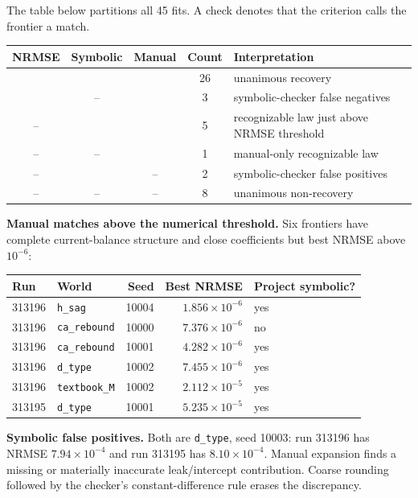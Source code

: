 \documentclass[10pt]{article}
\newcommand{\yes}{\checkmark}
\newcommand{\no}{--}
\begin{document}
The table below partitions all 45 fits.  A check denotes that the criterion calls
the frontier a match.

\begin{center}
\begin{tabular}{ccccl}
\toprule
NRMSE & Symbolic & Manual & Count & Interpretation\\
\midrule
\yes & \yes & \yes & 26 & unanimous recovery\\
\yes & \no  & \yes & 3 & symbolic-checker false negatives\\
\no  & \yes & \yes & 5 & recognizable law just above NRMSE threshold\\
\no  & \no  & \yes & 1 & manual-only recognizable law\\
\no  & \yes & \no  & 2 & symbolic-checker false positives\\
\no  & \no  & \no  & 8 & unanimous non-recovery\\
\bottomrule
\end{tabular}
\end{center}

\textbf{Manual matches above the numerical threshold.}  Six frontiers have
complete current-balance structure and close coefficients but best NRMSE above
$10^{-6}$:
\begin{center}
\small
\begin{tabular}{llrrl}
\toprule
Run & World & Seed & Best NRMSE & Project symbolic?\\
\midrule
313196 & \texttt{h\_sag} & 10004 & $1.856\times10^{-6}$ & yes\\
313196 & \texttt{ca\_rebound} & 10000 & $7.376\times10^{-6}$ & no\\
313196 & \texttt{ca\_rebound} & 10001 & $4.282\times10^{-6}$ & yes\\
313196 & \texttt{d\_type} & 10002 & $7.455\times10^{-6}$ & yes\\
313196 & \texttt{textbook\_M} & 10002 & $2.112\times10^{-5}$ & yes\\
313195 & \texttt{d\_type} & 10001 & $5.235\times10^{-5}$ & yes\\
\bottomrule
\end{tabular}
\end{center}

\textbf{Symbolic false positives.}  Both are \texttt{d\_type}, seed 10003:
run 313196 has NRMSE $7.94\times10^{-4}$ and run 313195 has
$8.10\times10^{-4}$.  Manual expansion finds a missing or materially inaccurate
leak/intercept contribution.  Coarse rounding followed by the checker's
constant-difference rule erases the discrepancy.
\end{document}
